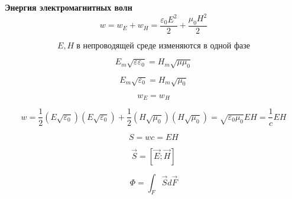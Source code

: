 \documentclass{article}
\begin{document}
	
	\textbf{Энергия электромагнитных волн}\\

	\begin{equation}
		w=w_E+w_H=\frac{\varepsilon_0E^2}{2}+\frac{\mu_0H^2}{2}
	\end{equation}

	\begin{equation}
		E, H\; \text{в непроводящей среде изменяются в одной фазе}
	\end{equation}

	\begin{equation}
		E_m\sqrt{\varepsilon\varepsilon_0}=H_m\sqrt{\mu\mu_0}
	\end{equation}
	
	\begin{equation}
		E_m\sqrt{\varepsilon_0}=H_m\sqrt{\mu_0}
	\end{equation}
	
	\begin{equation}
		w_E=w_H
	\end{equation}

	\begin{equation}
		w=\frac{1}{2}(E\sqrt{\varepsilon_0})(E\sqrt{\varepsilon_0})+\frac{1}{2}(H\sqrt{\mu_0})(H\sqrt{\mu_0})=\sqrt{\varepsilon_0\mu_0}EH=\frac{1}{c}EH
	\end{equation}

	\begin{equation}
		S = wc = EH
	\end{equation}

	\begin{equation}
		\vec S = [\vec E;\vec H]
	\end{equation}

	\begin{equation}
		\Phi = \int_F \vec Sd\vec F
	\end{equation}
\end{document}

